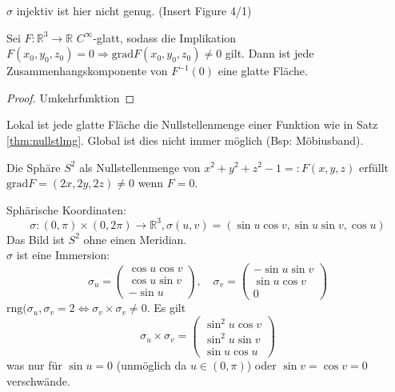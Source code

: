 \documentclass[11pt]{article}
\begin{document}
\begin{remark}
$\sigma$ injektiv ist hier nicht genug. (Insert Figure 4/1)
\end{remark}
\begin{theorem}\label{thm:nullstmg}
Sei $F: \mathbb R^3\to \mathbb R$ $C^\infty$-glatt, sodass die Implikation $F(x_0,y_0,z_0) = 0\Rightarrow \mathrm{grad} F(x_0,y_0,z_0)\neq 0$ gilt. Dann ist jede Zusammenhangskomponente von $F^{-1}(0)$ eine glatte Fläche.
\end{theorem}
\begin{proof}
Umkehrfunktion
\end{proof}
\begin{remark}
Lokal ist jede glatte Fläche die Nullstellenmenge einer Funktion wie in Satz \ref{thm:nullstlmg}. Global ist dies nicht immer möglich (Bsp: Möbiusband).
\end{remark}
\begin{example}
Die Sphäre $S^2$ als Nullstellenmenge von $x^2+y^2+z^2 -1 =: F(x,y,z)$ erfüllt $\mathrm{grad}F = (2x,2y,2z) \neq 0$ wenn $F=0$.
\end{example}
\begin{example}
Sphärische Koordinaten:\begin{equation*}
    \sigma:(0,\pi)\times(0,2\pi) \to \mathbb R^3, \sigma(u,v) = (\sin u\cos v, \sin u\sin v, \cos u)
\end{equation*}
Das Bild ist $S^2$ ohne einen Meridian.
\\
$\sigma$ ist eine Immersion:
\begin{equation*}
    \sigma_u = \left(\begin{array}{c}
         \cos u\cos v \\
         \cos u\sin v\\
         -\sin u
    \end{array}\right), \quad \sigma_v = \left(\begin{array}{c}
         -\sin u \sin v\\
         \sin u \cos v \\
         0
    \end{array}\right)
\end{equation*}
$\mathrm{rng}(\sigma_u,\sigma_v = 2\Leftrightarrow \sigma_v \times \sigma_v\neq 0$. Es gilt \begin{equation*}
    \sigma_u\times \sigma_v = \left( \begin{array}{c}
         \sin^2 u\cos v\\
         \sin^2 u\sin v\\
         \sin u\cos u
    \end{array}\right)
\end{equation*}
was nur für $\sin u = 0$ (unmöglich da $u\in (0,\pi)$) oder $\sin v = \cos v = 0$ verschwände.
\end{example}
\end{document}
